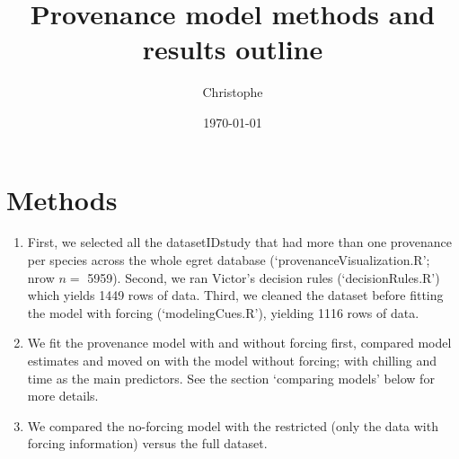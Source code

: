 \documentclass{article}\usepackage[]{graphicx}\usepackage[]{xcolor}
\begin{document}

\title{Provenance model methods and results outline}
\author{Christophe}
\date{\today}
\maketitle




\section{Methods}
\begin{enumerate}
\item First, we selected all the datasetIDstudy that had more than one provenance per species across the whole egret database (`provenanceVisualization.R'; nrow $n = $ 5959). Second, we ran Victor's decision rules (`decisionRules.R') which yields 1449 rows of data. Third, we cleaned the dataset before fitting the model with forcing (`modelingCues.R'), yielding 1116 rows of data. %

\item We fit the provenance model with and without forcing first, compared model estimates and moved on with the model without forcing; with chilling and time as the main predictors. See the section `comparing models' below for more details. 

\item We compared the no-forcing model with the restricted (only the data with forcing information) versus the full dataset.

\end{enumerate}
\end{document}
